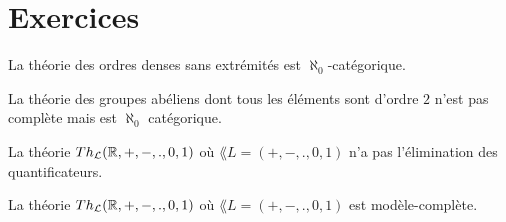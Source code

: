 \documentclass[a4paper, 12pt]{article}
\begin{document}
\section{Exercices}

\begin{exercice}
	La théorie des ordres denses sans extrémités est $\aleph_{0}$-catégorique.
\end{exercice}

\begin{exercice}
	La théorie des groupes abéliens dont tous les éléments sont d'ordre $2$
	n'est pas complète mais est $\aleph_{0}$ catégorique.
\end{exercice}

\begin{exercice}
	La théorie $Th_{\mathcal{L}}{(\mathbb{R}, +, -, ., 0, 1)}$ où $\lang{L} = (+, -, .,
	0, 1)$ n'a pas l'élimination des quantificateurs.
\end{exercice}

\begin{exercice}
	La théorie $Th_{\mathcal{L}}{(\mathbb{R}, +, -, ., 0, 1)}$ où $\lang{L} = (+, -, .,
	0, 1)$ est modèle-complète.
\end{exercice}
\end{document}
